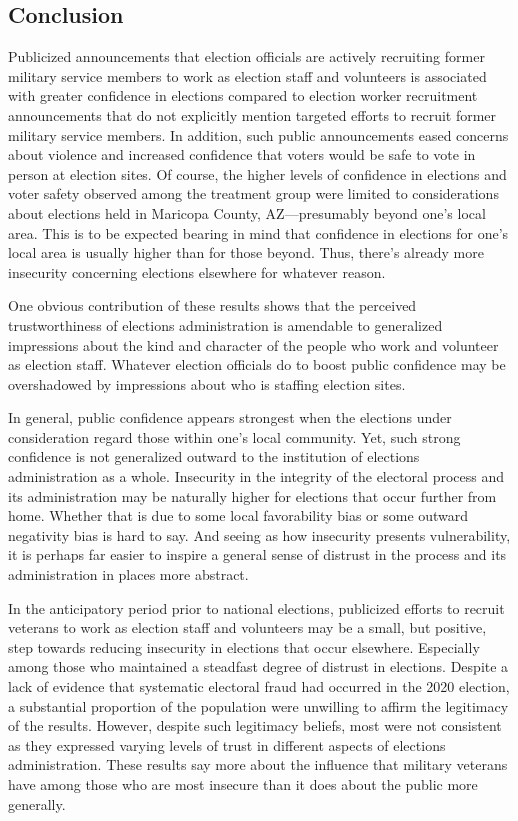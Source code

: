 \documentclass[
  12pt,
  letterpaper,
]{article}
\begin{document}
\subsection{Conclusion}\label{conclusion}

Publicized announcements that election officials are actively recruiting
former military service members to work as election staff and volunteers
is associated with greater confidence in elections compared to election
worker recruitment announcements that do not explicitly mention targeted
efforts to recruit former military service members. In addition, such
public announcements eased concerns about violence and increased
confidence that voters would be safe to vote in person at election
sites. Of course, the higher levels of confidence in elections and voter
safety observed among the treatment group were limited to considerations
about elections held in Maricopa County, AZ---presumably beyond one's
local area. This is to be expected bearing in mind that confidence in
elections for one's local area is usually higher than for those beyond.
Thus, there's already more insecurity concerning elections elsewhere for
whatever reason.

One obvious contribution of these results shows that the perceived
trustworthiness of elections administration is amendable to generalized
impressions about the kind and character of the people who work and
volunteer as election staff. Whatever election officials do to boost
public confidence may be overshadowed by impressions about who is
staffing election sites.

In general, public confidence appears strongest when the elections under
consideration regard those within one's local community. Yet, such
strong confidence is not generalized outward to the institution of
elections administration as a whole. Insecurity in the integrity of the
electoral process and its administration may be naturally higher for
elections that occur further from home. Whether that is due to some
local favorability bias or some outward negativity bias is hard to say.
And seeing as how insecurity presents vulnerability, it is perhaps far
easier to inspire a general sense of distrust in the process and its
administration in places more abstract.

In the anticipatory period prior to national elections, publicized
efforts to recruit veterans to work as election staff and volunteers may
be a small, but positive, step towards reducing insecurity in elections
that occur elsewhere. Especially among those who maintained a steadfast
degree of distrust in elections. Despite a lack of evidence that
systematic electoral fraud had occurred in the 2020 election, a
substantial proportion of the population were unwilling to affirm the
legitimacy of the results. However, despite such legitimacy beliefs,
most were not consistent as they expressed varying levels of trust in
different aspects of elections administration. These results say more
about the influence that military veterans have among those who are most
insecure than it does about the public more generally.
\end{document}
